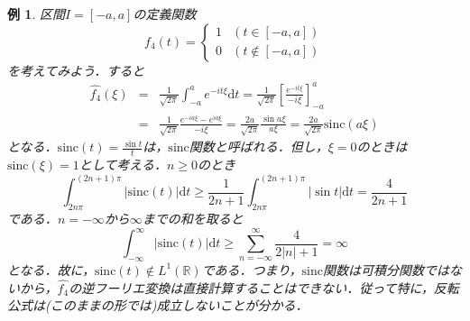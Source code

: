 \documentclass[a4j]{jsbook}
\newtheorem{example}[theorem]{例}
\numberwithin{theorem}{chapter}  %
\begin{document}
\begin{example}
\label{ex3-4}
区間\(I=[-a, a]\)の定義関数
\begin{equation*}
    f_4(t)=
    \begin{cases}
    1 & (t\in[-a, a]) \\
    0 & (t\notin[-a, a])
    \end{cases}
\end{equation*}
を考えてみよう．すると
\begin{eqnarray*}
\hat{f_4}(\xi)&=&\frac{1}{\sqrt{2\pi}}\int_{-a}^a e^{-it\xi}\mathrm{d}t=\frac{1}{\sqrt{2\pi}}\left[\frac{e^{-it\xi}}{-i\xi}\right]_{-a}^a \\
&=&\frac{1}{\sqrt{2\pi}}\frac{e^{-ia\xi}-e^{ia\xi}}{-i\xi}=\frac{2a}{\sqrt{2\pi}}\frac{\sin a\xi}{a\xi}=\frac{2a}{\sqrt{2\pi}}\mathrm{sinc}(a\xi)
\end{eqnarray*}
となる．\(\displaystyle\mathrm{sinc}(t)=\frac{\sin t}{t}\)は，\(\mathrm{sinc}\)関数と呼ばれる．但し，\(\xi=0\)のときは\(\mathrm{sinc}(\xi)=1\)として考える．\(n\geq 0\)のとき
\begin{equation*}
    \int_{2n\pi}^{(2n+1)\pi}|\mathrm{sinc}(t)|\mathrm{d}t\geq\frac{1}{2n+1}\int_{2n\pi}^{(2n+1)\pi}|\sin t|\mathrm{d}t=\frac{4}{2n+1}
\end{equation*}
である．\(n=-\infty\)から\(\infty\)までの和を取ると
\begin{equation*}
    \int_{-\infty}^\infty|\mathrm{sinc}(t)|\mathrm{d}t\geq\sum_{n=-\infty}^\infty\frac{4}{2|n|+1}=\infty
\end{equation*}
となる．故に，\(\mathrm{sinc}(t)\notin L^1(\mathbb{R})\)である．つまり，\(\mathrm{sinc}\)関数は可積分関数ではないから，\(\hat{f_4}\)の逆フーリエ変換は直接計算することはできない．従って特に，反転公式は(このままの形では)成立しないことが分かる．
\end{example}
\end{document}
